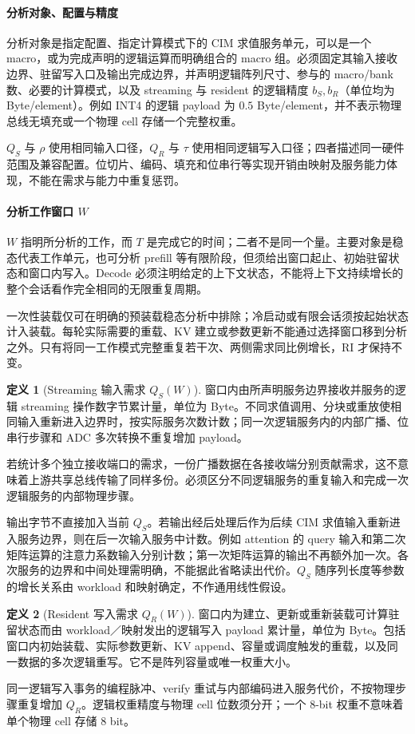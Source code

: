 \documentclass[11pt, a4paper]{ctexart}
\theoremstyle{definition}
\newtheorem{definition}{定义}[section]
\newcommand{\RI}{\mathrm{RI}}
\begin{document}
\paragraph{分析对象、配置与精度}
分析对象是指定配置、指定计算模式下的 CIM 求值服务单元，可以是一个 macro，或为完成声明的逻辑运算而明确组合的 macro 组。必须固定其输入接收边界、驻留写入口及输出完成边界，并声明逻辑阵列尺寸、参与的 macro/bank 数、必要的计算模式，以及 streaming 与 resident 的逻辑精度 $b_S,b_R$（单位均为 Byte/element）。例如 INT4 的逻辑 payload 为 $0.5$ Byte/element，并不表示物理总线无填充或一个物理 cell 存储一个完整权重。

$Q_S$ 与 $\rho$ 使用相同输入口径，$Q_R$ 与 $\tau$ 使用相同逻辑写入口径；四者描述同一硬件范围及兼容配置。位切片、编码、填充和位串行等实现开销由映射及服务能力体现，不能在需求与能力中重复惩罚。

\paragraph{分析工作窗口 $W$}
$W$ 指明所分析的工作，而 $T$ 是完成它的时间；二者不是同一个量。主要对象是稳态代表工作单元，也可分析 prefill 等有限阶段，但须给出窗口起止、初始驻留状态和窗口内写入。Decode 必须注明给定的上下文状态，不能将上下文持续增长的整个会话看作完全相同的无限重复周期。

一次性装载仅可在明确的预装载稳态分析中排除；冷启动或有限会话须按起始状态计入装载。每轮实际需要的重载、KV 建立或参数更新不能通过选择窗口移到分析之外。只有将同一工作模式完整重复若干次、两侧需求同比例增长，$\RI$ 才保持不变。

\begin{definition}[Streaming 输入需求 $Q_S(W)$]
窗口内由所声明服务边界接收并服务的逻辑 streaming 操作数字节累计量，单位为 Byte。不同求值调用、分块或重放使相同输入重新进入边界时，按实际服务次数计数；同一次逻辑服务内的内部广播、位串行步骤和 ADC 多次转换不重复增加 payload。
\end{definition}
若统计多个独立接收端口的需求，一份广播数据在各接收端分别贡献需求，这不意味着上游共享总线传输了同样多份。必须区分不同逻辑服务的重复输入和完成一次逻辑服务的内部物理步骤。

输出字节不直接加入当前 $Q_S$。若输出经后处理后作为后续 CIM 求值输入重新进入服务边界，则在后一次输入服务中计数。例如 attention 的 query 输入和第二次矩阵运算的注意力系数输入分别计数；第一次矩阵运算的输出不再额外加一次。各次服务的边界和中间处理需明确，不能据此省略读出代价。$Q_S$ 随序列长度等参数的增长关系由 workload 和映射确定，不作通用线性假设。

\begin{definition}[Resident 写入需求 $Q_R(W)$]
窗口内为建立、更新或重新装载可计算驻留状态而由 workload／映射发出的逻辑写入 payload 累计量，单位为 Byte。包括窗口内初始装载、实际参数更新、KV append、容量或调度触发的重载，以及同一数据的多次逻辑重写。它不是阵列容量或唯一权重大小。
\end{definition}
同一逻辑写入事务的编程脉冲、verify 重试与内部编码进入服务代价，不按物理步骤重复增加 $Q_R$。逻辑权重精度与物理 cell 位数须分开；一个 8-bit 权重不意味着单个物理 cell 存储 8 bit。
\end{document}
